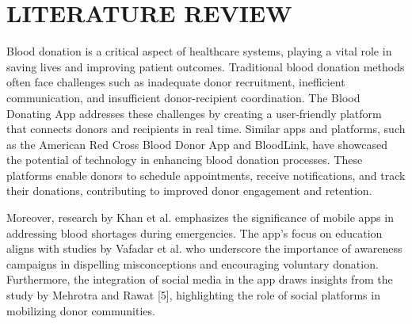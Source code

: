 \chapter{LITERATURE REVIEW}

Blood donation is a critical aspect of healthcare systems, playing a vital role in saving lives and improving patient outcomes. Traditional blood donation methods often face challenges such as inadequate donor recruitment, inefficient communication, and insufficient donor-recipient coordination. The Blood Donating App addresses these challenges by creating a user-friendly platform that connects donors and recipients in real time. Similar apps and platforms, such as the American Red Cross Blood Donor App and BloodLink, have showcased the potential of technology in enhancing blood donation processes. These platforms enable donors to schedule appointments, receive notifications, and track their donations, contributing to improved donor engagement and retention.

Moreover, research by Khan et al. emphasizes the significance of mobile apps in addressing blood shortages during emergencies. The app's focus on education aligns with studies by Vafadar et al. who underscore the importance of awareness campaigns in dispelling misconceptions and encouraging voluntary donation. Furthermore, the integration of social media in the app draws insights from the study by Mehrotra and Rawat [5], highlighting the role of social platforms in mobilizing donor communities.